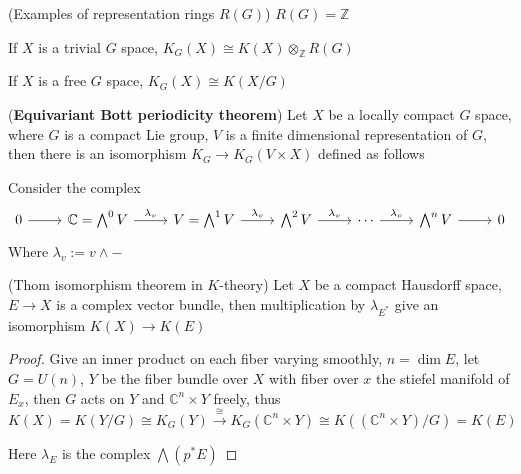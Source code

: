 \documentclass[../main.tex]{subfiles}
\begin{document}
\begin{example}(Examples of representation rings $R(G)$)
$R(G)=\mathbb Z$
\end{example}

\begin{theorem}
If $X$ is a trivial $G$ space, $K_G(X)\cong K(X)\otimes_{\mathbb Z}R(G)$ \par
If $X$ is a free $G$ space, $K_G(X)\cong K(X/G)$
\end{theorem}

\begin{theorem}(\textbf{Equivariant Bott periodicity theorem})\label{Equivariant Bott periodicity theorem}
Let $X$ be a locally compact $G$ space, where $G$ is a compact Lie group, $V$ is a finite dimensional representation of $G$, then there is an isomorphism $K_G\to K_G(V\times X)$ defined as follows \par
Consider the complex
\[
\begin{tikzcd}
0 \arrow[r] & \mathbb C=\bigwedge^0V \arrow[r, "\lambda_v"] & V=\bigwedge^1V \arrow[r, "\lambda_v"] & \bigwedge^2V \arrow[r, "\lambda_v"] & \cdots \arrow[r, "\lambda_v"] & \bigwedge^nV \arrow[r] &0
\end{tikzcd}
\]
Where $\lambda_v:=v\wedge-$
\end{theorem}

\begin{theorem}(Thom isomorphism theorem in $K$-theory)
Let $X$ be a compact Hausdorff space, $E\to X$ is a complex vector bundle, then multiplication by $\lambda_{E^*}$ give an isomorphism $K(X)\to K(E)$
\end{theorem}
\begin{proof}
Give an inner product on each fiber varying smoothly, $n=\dim E$, let $G=U(n)$, $Y$ be the fiber bundle over $X$ with fiber over $x$ the stiefel manifold of $E_x$, then $G$ acts on $Y$ and $\mathbb C^n\times Y$ freely, thus $K(X)=K(Y/G)\cong K_G(Y)\xrightarrow{\cong}K_G\left(\mathbb C^n\times Y\right)\cong K\left((\mathbb C^n\times Y)/G\right)=K(E)$ \par
Here $\lambda_E$ is the complex $\bigwedge\left(p^*E\right)$
\end{proof}
\end{document}
